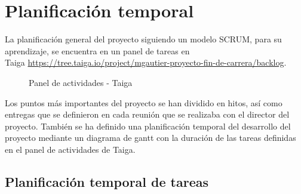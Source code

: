 \chapter{Planificación temporal}
\label{chap:planificacion}

La planificación general del proyecto siguiendo un modelo SCRUM, para su aprendizaje, se encuentra en un panel de tareas en \\Taiga \url{https://tree.taiga.io/project/mgautier-proyecto-fin-de-carrera/backlog}.

\begin{figure}[H]
\caption{Panel de actividades - Taiga}
\end{figure}

Los puntos más importantes del proyecto se han dividido en hitos, así como entregas que se definieron en cada reunión que se realizaba con el director del proyecto. También se ha definido una planificación temporal del desarrollo del proyecto mediante un diagrama de gantt con la duración de las tareas definidas en el panel de actividades de Taiga.\\
\section[Planificación temporal de tareas]{Planificación temporal de tareas}


